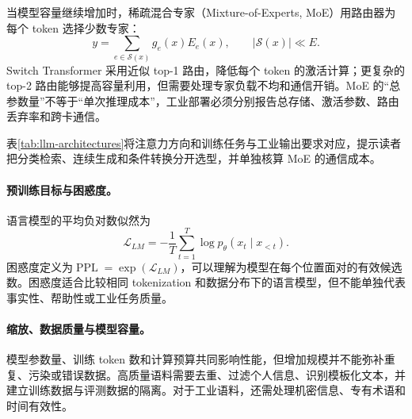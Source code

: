 当模型容量继续增加时，稀疏混合专家（Mixture-of-Experts, MoE）用路由器为每个 token 选择少数专家：
\begin{equation}
 y=\sum_{e\in\mathcal{S}(x)}g_e(x)E_e(x),\qquad |\mathcal{S}(x)|\ll E.
\end{equation}
Switch Transformer 采用近似 top-1 路由，降低每个 token 的激活计算；更复杂的 top-2 路由能够提高容量利用，但需要处理专家负载不均和通信开销。MoE 的“总参数量”不等于“单次推理成本”，工业部署必须分别报告总存储、激活参数、路由丢弃率和跨卡通信。

\begin{table}[htbp]
\centering
\caption{语言模型架构与工业任务匹配}
\label{tab:llm-architectures}
\scriptsize
\setlength{\tabcolsep}{3pt}
\end{table}

表\ref{tab:llm-architectures}将注意力方向和训练任务与工业输出要求对应，提示读者把分类检索、连续生成和条件转换分开选型，并单独核算 MoE 的通信成本。
\paragraph{预训练目标与困惑度。}
语言模型的平均负对数似然为
\begin{equation}
 \mathcal{L}_{LM}=-\frac1T\sum_{t=1}^{T}\log p_\theta(x_t\mid x_{<t}).
\end{equation}
困惑度定义为$\operatorname{PPL}=\exp(\mathcal{L}_{LM})$，可以理解为模型在每个位置面对的有效候选数。困惑度适合比较相同 tokenization 和数据分布下的语言模型，但不能单独代表事实性、帮助性或工业任务质量。

\paragraph{缩放、数据质量与模型容量。}
模型参数量、训练 token 数和计算预算共同影响性能，但增加规模并不能弥补重复、污染或错误数据。高质量语料需要去重、过滤个人信息、识别模板化文本，并建立训练数据与评测数据的隔离。对于工业语料，还需处理机密信息、专有术语和时间有效性。

